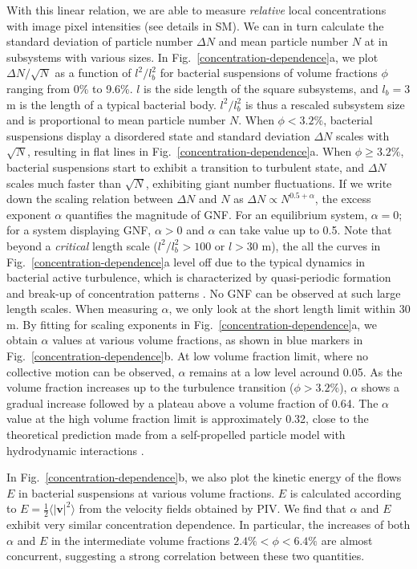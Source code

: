 \documentclass[twocolumn,aps,prl,amsmath,amssymb,longbibliography]{revtex4-2}
\begin{document}
With this linear relation, we are able to measure \emph{relative} local concentrations with image pixel intensities (see details in SM). We can in turn calculate the standard deviation of particle number $\Delta N$ and mean particle number $N$ at in subsystems with various sizes. In Fig.~\ref{concentration-dependence}a, we plot $\Delta N / \sqrt N$ as a function of $l^2/l_b^2$ for bacterial suspensions of volume fractions $\phi$ ranging from 0\% to 9.6\%.
$l$ is the side length of the square subsystems, and $l_b=3$ \textmu m is the length of a typical bacterial body. $l^2/l_b^2$ is thus a rescaled subsystem size and is proportional to mean particle number $N$.
When $\phi<3.2\%$, bacterial suspensions display a disordered state and standard deviation $\Delta N$ scales with $\sqrt N$, resulting in flat lines in Fig.~\ref{concentration-dependence}a.
When $\phi\ge3.2\%$, bacterial suspensions start to exhibit a transition to turbulent state, and $\Delta N$ scales much faster than $\sqrt N$, exhibiting giant number fluctuations.
If we write down the scaling relation between $\Delta N$ and $N$ as $\Delta N \propto N^{0.5+\alpha}$, the excess exponent $\alpha$ quantifies the magnitude of GNF.
For an equilibrium system, $\alpha=0$; for a system displaying GNF, $\alpha>0$ and $\alpha$ can take value up to 0.5.
Note that beyond a \emph{critical} length scale ($l^2/l_b^2>100$ or $l>30$ \textmu m), the all the curves in Fig.~\ref{concentration-dependence}a level off due to the typical dynamics in bacterial active turbulence, which is characterized by quasi-periodic formation and break-up of concentration patterns \cite{Saintillan2012}. No GNF can be observed at such large length scales. When measuring $\alpha$, we only look at the short length limit within 30 \textmu m.
By fitting for scaling exponents in Fig.~\ref{concentration-dependence}a, we obtain $\alpha$ values at various volume fractions, as shown in blue markers in Fig.~\ref{concentration-dependence}b.
At low volume fraction limit, where no collective motion can be observed, $\alpha$ remains at a low level acround 0.05.
As the volume fraction increases up to the turbulence transition ($\phi>3.2\%$), $\alpha$ shows a gradual increase followed by a plateau above a volume fraction of 0.64.
The $\alpha$ value at the high volume fraction limit is approximately 0.32, close to the theoretical prediction made from a self-propelled particle model with hydrodynamic interactions \cite{AditiSimha2002}.

In Fig.~\ref{concentration-dependence}b, we also plot the kinetic energy of the flows $E$ in bacterial suspensions at various volume fractions.
$E$ is calculated according to $E = \frac{1}{2}\langle|\boldsymbol{v}|^2 \rangle$ from the velocity fields obtained by PIV.
We find that $\alpha$ and $E$ exhibit very similar concentration dependence. In particular, the increases of both $\alpha$ and $E$ in the intermediate volume fractions $2.4\%<\phi<6.4\%$ are almost concurrent, suggesting a strong correlation between these two quantities.
\end{document}
